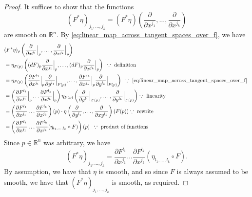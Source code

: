 \documentclass[notoc,notitlepage]{tufte-book}
\begin{document}
\begin{proof}
  It suffices to show that the functions
  \begin{equation*}
    (F^* \eta)_{j_1, \ldots, j_k} = (F^* \eta) \left( \frac{\partial}{\partial x^{j_1}}, \ldots,
    \frac{\partial}{\partial x^{j_k}} \right)
  \end{equation*}
  are smooth on $\mathbb{R}^n$. By \cref{eq:linear_map_across_tangent_spaces_over_f}, we have
  \begin{align*}
    &(F^* \eta)_p \left( \frac{\partial}{\partial x^{j_1}} \at{p}{}, \ldots,
      \frac{\partial}{\partial x^{j_k}}\at{p}{} \right) \\
    &= \eta_{F(p)} \left( (\dif{F})_p \frac{\partial}{\partial x^{j_1}}\at{p}{}, \ldots,
      (\dif{F})_p \frac{\partial}{\partial x^{j_k}}\at{p}{} \right)
      \enspace \because \text{ definition }\\
    &= \eta_{F(p)} \left( \frac{\partial F^{l_1}}{\partial x^{j_1}}\at{p}{} 
      \frac{\partial}{\partial y^{l_1}}\at{F(p)}{}, \ldots,
      \frac{\partial F^{l_k}}{\partial x^{j_k}}\at{p}{}
    \frac{\partial}{\partial y^{l_k}}\at{F(p)}{} \right)
      \enspace \because \text{ \cref{eq:linear_map_across_tangent_spaces_over_f} } \\
    &= \left( \frac{\partial F^{l_1}}{\partial x^{j_1}}\at{p}{} \hdots
      \frac{\partial F^{l_k}}{\partial x^{j_k}}\at{p}{} \right) \eta_{F(p)}
      \left( \frac{\partial}{\partial y^{l_1}}\at{F(p)}{}, \ldots,
      \frac{\partial}{\partial y^{l_k}}\at{F(p)}{} \right)
      \because \text{ linearity } \\
    &= \left( \frac{\partial F^{l_1}}{\partial x^{j_1}} \hdots 
      \frac{\partial F^{l_k}}{\partial x^{j_k}} \right)(p) \cdot \eta \left( 
      \frac{\partial}{\partial y^{l_1}}, \ldots, \frac{\partial}{\partial xy^{l_k}}
      \right)(F(p)) \because \text{ rewrite } \\
    &= \left( \frac{\partial F^{l_1}}{\partial x^{j_1}} \hdots
      \frac{\partial F^{l_k}}{\partial x^{j_k}} ( \eta_{l_1, \ldots, l_k} \circ F )
      \right)(p) \enspace \because \text{ product of functions }
  \end{align*}
  Since $p \in \mathbb{R}^n$ was arbitrary, we have
  \begin{equation*}
    (F^* \eta)_{j_1, \ldots, j_k} = \frac{\partial F^{l_1}}{\partial x^{j_1}} \hdots
      \frac{\partial F^{l_k}}{\partial x^{j_k}} (\eta_{l_1, \ldots, l_k} \circ F).
  \end{equation*}
  By assumption, we have that $\eta$ is smooth, and so since $F$ is always assumed to be smooth,
  we have that $(F^* \eta)_{j_1, \ldots, j_k}$ is smooth, as required.
\end{proof}
\end{document}
